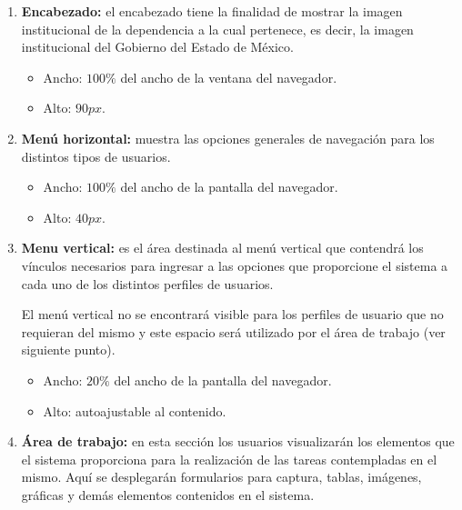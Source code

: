 
    \begin{enumerate}
        \item {\bf Encabezado:} el encabezado tiene la finalidad de mostrar la imagen institucional de la dependencia a la cual pertenece, es decir, la imagen institucional del Gobierno del Estado de México.
        \begin{itemize}
            \item Ancho: $100\%$ del ancho de la ventana del navegador.
            \item Alto: $90px$.
        \end{itemize}

        \item {\bf Menú horizontal:} muestra las opciones generales de navegación para los distintos tipos de usuarios.
        \begin{itemize}
            \item Ancho: $100\%$ del ancho de la pantalla del navegador.
            \item Alto: $40px$.
        \end{itemize}
        
        \item {\bf Menu vertical:} es el área destinada al menú vertical que contendrá los vínculos necesarios para ingresar a las opciones que proporcione el sistema a cada uno de los distintos perfiles de usuarios.
        
        El menú vertical no se encontrará visible para los perfiles de usuario que no requieran del mismo y este espacio será utilizado por el área de trabajo (ver siguiente punto).
        
        \begin{itemize}
            \item Ancho: $20\%$ del ancho de la pantalla del navegador.
            \item Alto: autoajustable al contenido.
        \end{itemize}
        
        \item {\bf Área de trabajo:} en esta sección los usuarios visualizarán los elementos que el sistema proporciona para la realización de las tareas contempladas en el mismo. Aquí se desplegarán formularios para captura, tablas, imágenes, gráficas y demás elementos contenidos en el sistema.\\
        

\end{enumerate}
